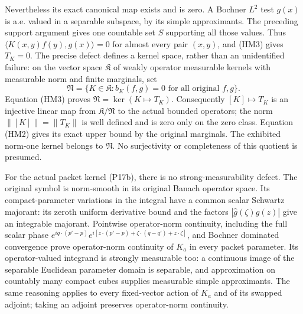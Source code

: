 \documentclass[
  11pt,
]{article}
\begin{document}
Nevertheless its exact canonical map exists and is zero. A Bochner
\(L^2\) test \(g(x)\) is a.e. valued in a separable subspace, by its
simple approximants. The preceding support argument gives one countable
set \(S\) supporting all those values. Thus
\(\langle K(x,y)f(y),g(x)\rangle=0\) for almost every pair \((x,y)\),
and (HM3) gives \(T_K=0\). The precise defect defines a kernel space,
rather than an unidentified failure: on the vector space \(\mathfrak K\)
of weakly operator measurable kernels with measurable norm and finite
marginals, set \[
\mathfrak N=\{K\in\mathfrak K:b_K(f,g)=0\text{ for all original }f,g\}.
\tag{HM5}
\] Equation (HM3) proves \(\mathfrak N=\ker(K\mapsto T_K)\).
Consequently \([K]\mapsto T_K\) is an injective linear map from
\(\mathfrak K/\mathfrak N\) to the actual bounded operators; the norm
\(\|[K]\|=\|T_K\|\) is well defined and is zero only on the zero class.
Equation (HM2) gives its exact upper bound by the original marginals.
The exhibited norm-one kernel belongs to \(\mathfrak N\). No
surjectivity or completeness of this quotient is presumed.

For the actual packet kernel (P17b), there is no strong-measurability
defect. The original symbol is norm-smooth in its original Banach
operator space. Its compact-parameter variations in the integral have a
common scalar Schwartz majorant: its zeroth uniform derivative bound and
the factors \(|\widehat g(\zeta)g(z)|\) give an integrable majorant.
Pointwise operator-norm continuity, including the full scalar phase
\(e^{iq\cdot(p'-p)}e^{i[z\cdot(p'-p)+\zeta\cdot(q-q')+z\cdot\zeta]}\),
and Bochner dominated convergence prove operator-norm continuity of
\(K_a\) in every packet parameter. Its operator-valued integrand is
strongly measurable too: a continuous image of the separable Euclidean
parameter domain is separable, and approximation on countably many
compact cubes supplies measurable simple approximants. The same
reasoning applies to every fixed-vector action of \(K_a\) and of its
swapped adjoint; taking an adjoint preserves operator-norm continuity.
\end{document}
